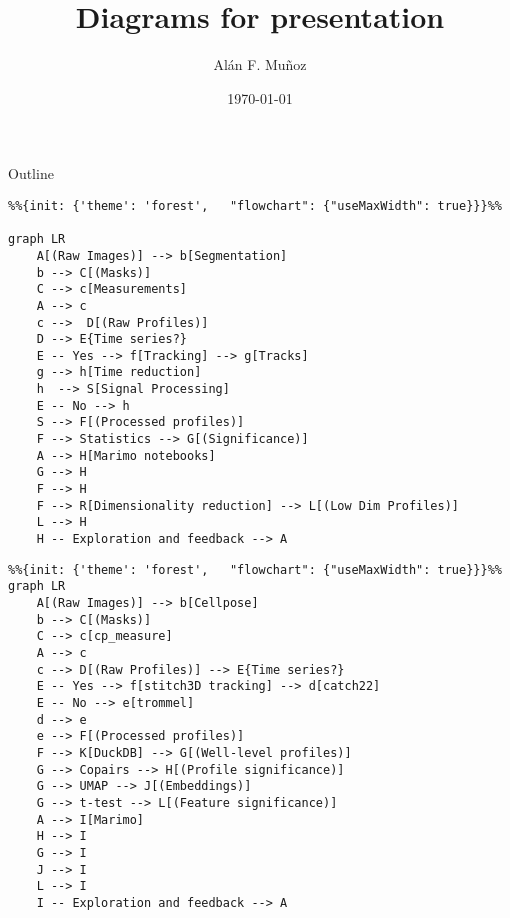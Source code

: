 \documentclass[presentation]{beamer}
\author{Alán F. Muñoz}
\date{\today}
\title{Diagrams for presentation}
\begin{document}
\maketitle
\begin{frame}{Outline}
\tableofcontents
\end{frame}

\begin{verbatim}
%%{init: {'theme': 'forest',   "flowchart": {"useMaxWidth": true}}}%%

graph LR
    A[(Raw Images)] --> b[Segmentation]
    b --> C[(Masks)]
    C --> c[Measurements]
    A --> c
    c -->  D[(Raw Profiles)]
    D --> E{Time series?}
    E -- Yes --> f[Tracking] --> g[Tracks]
    g --> h[Time reduction]
    h  --> S[Signal Processing]
    E -- No --> h 
    S --> F[(Processed profiles)]
    F --> Statistics --> G[(Significance)]
    A --> H[Marimo notebooks]
    G --> H
    F --> H
    F --> R[Dimensionality reduction] --> L[(Low Dim Profiles)]
    L --> H  
    H -- Exploration and feedback --> A  
\end{verbatim}

\begin{verbatim}
%%{init: {'theme': 'forest',   "flowchart": {"useMaxWidth": true}}}%%
graph LR
    A[(Raw Images)] --> b[Cellpose]
    b --> C[(Masks)]
    C --> c[cp_measure]
    A --> c
    c --> D[(Raw Profiles)] --> E{Time series?}
    E -- Yes --> f[stitch3D tracking] --> d[catch22]  
    E -- No --> e[trommel] 
    d --> e  
    e --> F[(Processed profiles)]
    F --> K[DuckDB] --> G[(Well-level profiles)]
    G --> Copairs --> H[(Profile significance)]
    G --> UMAP --> J[(Embeddings)]
    G --> t-test --> L[(Feature significance)]  
    A --> I[Marimo]
    H --> I
    G --> I
    J --> I
    L --> I  
    I -- Exploration and feedback --> A  
\end{verbatim}
\end{document}
